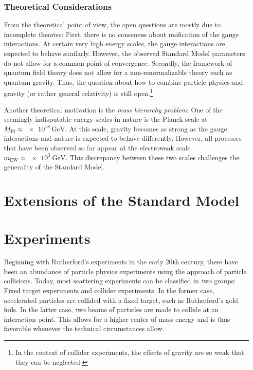 \subsubsection{Theoretical Considerations}
From the theoretical point of view, the open questions are mostly due to incomplete theories: 
First, there is no consensus about unification of the gauge interactions. At certain very high energy scales, the gauge interactions are expected to behave similarly. However, the observed Standard Model parameters do not allow for a common point of convergence\cite{Amaldi:Comparisongrandunified}.
Secondly, the framework of quantum field theory does not allow for a non-renormalizable theory such as quantum gravity. Thus, the question about how to combine particle physics and gravity (or rather general relativity) is still open.\footnote{In the context of collider experiments, the effects of gravity are so weak that they can be neglected.}

Another theoretical motivation is the \emph{mass hierarchy problem}: One of the seemingly indisputable energy scales in nature is the Planck scale at $M_\text{Pl} \approx \SI{e18}{\GeV}$. At this scale, gravity becomes as strong as the gauge interactions and nature is expected to behave differently. However, all processes that have been observed so far appear at the electroweak scale $m_\text{EW} \approx \SI{e3}{\GeV}$. This discrepancy between these two scales challenges the generality of the Standard Model.


\section{Extensions of the Standard Model}


\section{Experiments}
Beginning with Rutherford's experiments in the early 20th century, there have been an abundance of particle physics experiments using the approach of particle collisions. Today, most scattering experiments can be classified in two groups: Fixed target experiments and collider experiments. In the former case, accelerated particles are collided with a fixed target, such as Rutherford's gold foils. In the latter case, two beams of particles are made to collide at an interaction point. This allows for a higher center of mass energy and is thus favorable whenever the technical circumstances allow.

